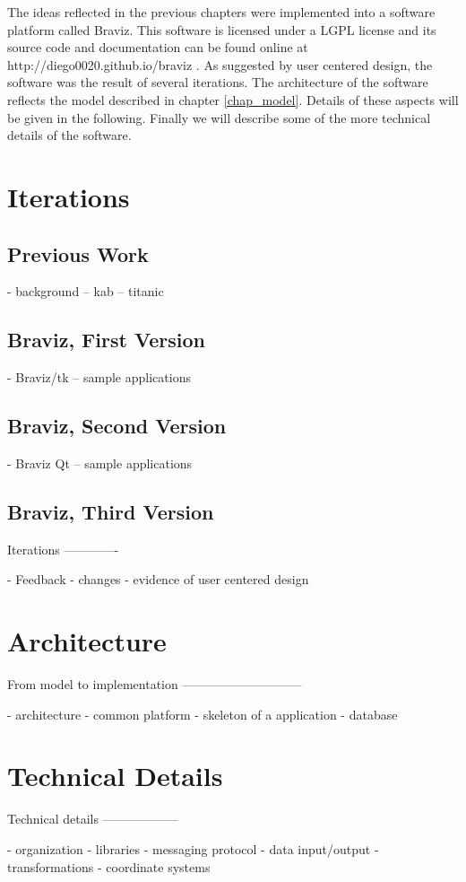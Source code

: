 
The ideas reflected in the previous chapters were implemented into a software platform called Braviz. This software is licensed under a LGPL license and its source code and documentation can be found online at http://diego0020.github.io/braviz . As suggested by user centered design, the software was the result of several iterations. The architecture of the software reflects the model described in chapter \ref{chap_model}. Details of these aspects will be given in the following. Finally we will describe some of the more technical details of the software.

\section{Iterations}



\subsection{Previous Work}
- background
-- kab
-- titanic

\subsection{Braviz, First Version}
- Braviz/tk
-- sample applications

\subsection{Braviz, Second Version}
- Braviz Qt
-- sample applications

\subsection{Braviz, Third Version}


Iterations
-------------

- Feedback
- changes
- evidence of user centered design








\section{Architecture}

From model to implementation
-----------------------------

- architecture
- common platform
- skeleton of a application
- database


\section{Technical Details}

Technical details
------------------

- organization
- libraries
- messaging protocol
- data input/output
- transformations
- coordinate systems



